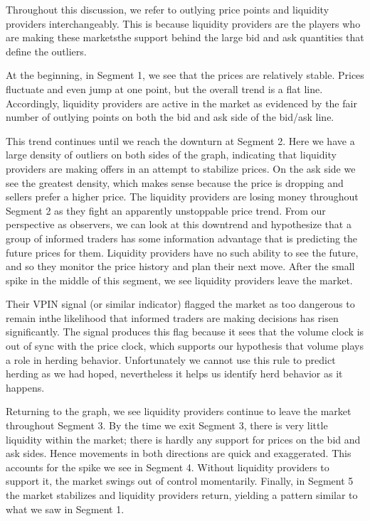 Throughout this discussion, we refer to outlying price points and liquidity providers interchangeably.
This is because liquidity providers are the players who are making these markets\textemdash the support behind the large bid and ask quantities that define the outliers.

At the beginning, in Segment 1, we see that the prices are relatively stable. 
Prices fluctuate and even jump at one point, but the overall trend is a flat line. 
Accordingly, liquidity providers are active in the market as evidenced by the fair number of outlying points on both the bid and ask side of the bid/ask line. 

This trend continues until we reach the downturn at Segment 2.
Here we have a large density of outliers on both sides of the graph, indicating that liquidity providers are making offers in an attempt to stabilize prices. 
On the ask side we see the greatest density, which makes sense because the price is dropping and sellers prefer a higher price. 
The liquidity providers are losing money throughout Segment 2 as they fight an apparently unstoppable price trend.
From our perspective as observers, we can look at this downtrend and hypothesize that a group of informed traders has some information advantage that is predicting the future prices for them. 
Liquidity providers have no such ability to see the future, and so they monitor the price history and plan their next move. 
After the small spike in the middle of this segment, we see liquidity providers leave the market.

Their VPIN signal (or similar indicator) flagged the market as too dangerous to remain in\textemdash the likelihood that informed traders are making decisions has risen significantly.
The signal produces this flag because it sees that the volume clock is out of sync with the price clock, which supports our hypothesis that volume plays a role in herding behavior.
Unfortunately we cannot use this rule to predict herding as we had hoped, nevertheless it helps us identify herd behavior as it happens.

Returning to the graph, we see liquidity providers continue to leave the market throughout Segment 3.
By the time we exit Segment 3, there is very little liquidity within the market; there is hardly any support for prices on the bid and ask sides.
Hence movements in both directions are quick and exaggerated. 
This accounts for the spike we see in Segment 4. 
Without liquidity providers to support it, the market swings out of control momentarily.
Finally, in Segment 5 the market stabilizes and liquidity providers return, yielding a pattern similar to what we saw in Segment 1.

